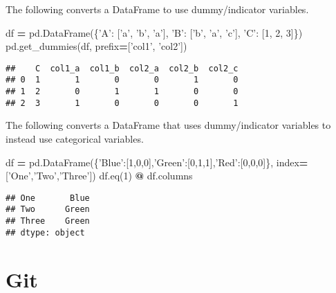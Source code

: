 \documentclass[]{book}
\newenvironment{Shaded}{\begin{snugshade}}{\end{snugshade}}
\newcommand{\DecValTok}[1]{\textcolor[rgb]{0.00,0.00,0.81}{#1}}
\newcommand{\NormalTok}[1]{#1}
\newcommand{\OperatorTok}[1]{\textcolor[rgb]{0.81,0.36,0.00}{\textbf{#1}}}
\newcommand{\StringTok}[1]{\textcolor[rgb]{0.31,0.60,0.02}{#1}}
\begin{document}
The following converts a DataFrame to use dummy/indicator variables.

\begin{Shaded}
\begin{Highlighting}[]
\NormalTok{df }\OperatorTok{=}\NormalTok{ pd.DataFrame(\{}\StringTok{'A'}\NormalTok{: [}\StringTok{'a'}\NormalTok{, }\StringTok{'b'}\NormalTok{, }\StringTok{'a'}\NormalTok{], }\StringTok{'B'}\NormalTok{: [}\StringTok{'b'}\NormalTok{, }\StringTok{'a'}\NormalTok{, }\StringTok{'c'}\NormalTok{], }\StringTok{'C'}\NormalTok{: [}\DecValTok{1}\NormalTok{, }\DecValTok{2}\NormalTok{, }\DecValTok{3}\NormalTok{]\})}
\NormalTok{pd.get_dummies(df, prefix}\OperatorTok{=}\NormalTok{[}\StringTok{'col1'}\NormalTok{, }\StringTok{'col2'}\NormalTok{])}
\end{Highlighting}
\end{Shaded}

\begin{verbatim}
##    C  col1_a  col1_b  col2_a  col2_b  col2_c
## 0  1       1       0       0       1       0
## 1  2       0       1       1       0       0
## 2  3       1       0       0       0       1
\end{verbatim}

The following converts a DataFrame that uses dummy/indicator variables to instead use categorical variables.

\begin{Shaded}
\begin{Highlighting}[]
\NormalTok{df }\OperatorTok{=}\NormalTok{ pd.DataFrame(\{}\StringTok{'Blue'}\NormalTok{:[}\DecValTok{1}\NormalTok{,}\DecValTok{0}\NormalTok{,}\DecValTok{0}\NormalTok{],}\StringTok{'Green'}\NormalTok{:[}\DecValTok{0}\NormalTok{,}\DecValTok{1}\NormalTok{,}\DecValTok{1}\NormalTok{],}\StringTok{'Red'}\NormalTok{:[}\DecValTok{0}\NormalTok{,}\DecValTok{0}\NormalTok{,}\DecValTok{0}\NormalTok{]\}, index}\OperatorTok{=}\NormalTok{[}\StringTok{'One'}\NormalTok{,}\StringTok{'Two'}\NormalTok{,}\StringTok{'Three'}\NormalTok{])}
\NormalTok{df.eq(}\DecValTok{1}\NormalTok{) }\OperatorTok{@}\NormalTok{ df.columns}
\end{Highlighting}
\end{Shaded}

\begin{verbatim}
## One       Blue
## Two      Green
## Three    Green
## dtype: object
\end{verbatim}

\hypertarget{git}{%
\chapter{Git}\label{git}}
\end{document}
